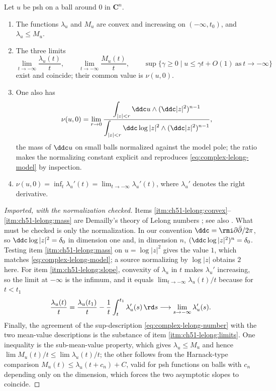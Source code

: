\begin{proposition}\label{prop:ch51-lelong-three}
Let \(u\) be psh on a ball around \(0\) in \(\mathbf C^n\).
\begin{enumerate}
\item\label{itm:ch51-lelong:convex}
      The functions \(\lambda_u\) and \(M_u\) are convex and increasing on
      \((-\infty,t_0)\), and \(\lambda_u\leq M_u\).
\item\label{itm:ch51-lelong:limits}
      The three limits
      \[
       \lim_{t\to-\infty}\frac{\lambda_u(t)}{t},
       \qquad
       \lim_{t\to-\infty}\frac{M_u(t)}{t},
       \qquad
       \sup\{\gamma\geq0\mid u\leq\gamma t+O(1)\ \text{as}\ t\to-\infty\}
      \]
      exist and coincide; their common value is \(\nu(u,0)\).
\item\label{itm:ch51-lelong:mass}
      One also has
      \[
       \nu(u,0)
       =\lim_{r\to0}
         \frac{\displaystyle\int_{|z|<r}\ddc u\wedge(\ddc|z|^2)^{n-1}}
              {\displaystyle\int_{|z|<r}
                 \ddc\log|z|^2\wedge(\ddc|z|^2)^{n-1}},
      \]
      the mass of \(\ddc u\) on small balls normalized against the model
      pole; the ratio makes the normalizing constant explicit and
      reproduces \eqref{eq:complex-lelong-model} by inspection.
\item\label{itm:ch51-lelong:slope}
      \(\nu(u,0)=\inf_{t}\lambda_u'(t)=\lim_{t\to-\infty}\lambda_u'(t)\),
      where \(\lambda_u'\) denotes the right derivative.
\end{enumerate}
\end{proposition}

\begin{proof}[Imported, with the normalization checked]
Items \cref{itm:ch51-lelong:convex}--\cref{itm:ch51-lelong:mass} are
Demailly's theory of Lelong numbers \cite[Chapter~III]{DemBook}; see also
\cite{Lel68,Siu74,Dem93}.  What must be checked is only the
normalization.  In our convention \(\ddc=\rmi\partial\bar\partial/2\pi\),
so \(\ddc\log|z|^2=\delta_0\) in dimension one and, in dimension \(n\),
\((\ddc\log|z|^2)^n=\delta_0\).  Testing item
\cref{itm:ch51-lelong:mass} on \(u=\log|z|^2\) gives the value \(1\), which
matches \eqref{eq:complex-lelong-model}; a source normalizing by
\(\log|z|\) obtains \(2\) here.  For item \cref{itm:ch51-lelong:slope},
convexity of \(\lambda_u\) in \(t\) makes \(\lambda_u'\) increasing, so
the limit at \(-\infty\) is the infimum, and it equals
\(\lim_{t\to-\infty}\lambda_u(t)/t\) because for \(t<t_1\)
\[
 \frac{\lambda_u(t)}{t}
 =\frac{\lambda_u(t_1)}{t}
   -\frac{1}{t}\int_t^{t_1}\lambda_u'(s)\,\rd s
 \longrightarrow\lim_{s\to-\infty}\lambda_u'(s).
\]
Finally, the agreement of the sup-description
\eqref{eq:complex-lelong-number} with the two mean-value descriptions is
the substance of item \cref{itm:ch51-lelong:limits}.  One inequality is the
sub-mean-value property, which gives
\(\lambda_u\leq M_u\) and hence
\(\lim M_u(t)/t\leq\lim\lambda_u(t)/t\); the other follows from the
Harnack-type comparison \(M_u(t)\leq\lambda_u(t+c_n)+C\), valid for psh
functions on balls with \(c_n\) depending only on the dimension, which
forces the two asymptotic slopes to coincide.
\end{proof}

